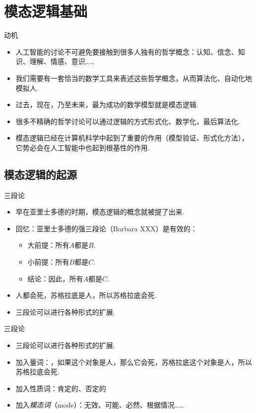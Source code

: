 \chapter{模态逻辑基础}\label{chap:modal-logic}

\begingroup
\newcommand{\pref}{Chapters/modal-logic/figures}

{动机}
    \begin{itemize}
        \item 人工智能的讨论不可避免要接触到很多人独有的哲学概念：认知、信念、知识、理解、情感、意识……
        \item 我们需要有一套恰当的数学工具来表述这些哲学概念，从而算法化、自动化地模拟人.
        \item 过去，现在，乃至未来，最为成功的数学模型就是模态逻辑.
        \item 很多不精确的哲学讨论可以通过逻辑的方式形式化、数学化，最后算法化.
        \item 模态逻辑已经在计算机科学中起到了重要的作用（模型验证、形式化方法），它势必会在人工智能中也起到根基性的作用.
    \end{itemize}
    
    
    \section{模态逻辑的起源}
    
    {三段论}
    \begin{itemize}
        \item 早在亚里士多德的时期，模态逻辑的概念就被提了出来.
        \item 回忆：亚里士多德的强三段论（Barbara XXX）是有效的：
        \begin{itemize}
            \item 大前提：所有$A$都是$B$.
            \item 小前提：所有$B$都是$C$.
            \item 结论：因此，所有$A$都是$C$.
        \end{itemize}
    
        \item 人都会死，苏格拉底是人，所以苏格拉底会死.
        \item 三段论可以进行各种形式的扩展.
    \end{itemize}
    
    
    {三段论}
    \begin{itemize}
        \item 三段论可以进行各种形式的扩展.
        \item 加入量词：，如果这个对象是人，那么它会死，苏格拉底这个对象是人，所以苏格拉底会死.
        \item 加入性质词：肯定的、否定的
        \item 加入\emph{模态词}（mode）：无效、可能、必然、根据情况……
    \end{itemize}
    
